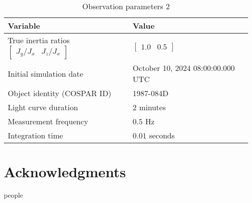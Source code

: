 \documentclass[a4paper,twocolumn]{spaceDebrisC} %
\begin{document}
\begin{table}[ht]
  \centering
  \caption{Observation parameters 2}
  \vspace*{6pt}
  \begin{tabular}{|l|l|}
  \hline
  \textbf{Variable} & \textbf{Value} \\ \hline
  True inertia ratios $\begin{bmatrix}J_y / J_x & J_z / J_x\end{bmatrix}$ & $\begin{bmatrix} 1.0 & 0.5 \end{bmatrix}$ \\ \hline
  Initial simulation date & October 10, 2024 08:00:00.000 UTC \\ \hline
  Object identity (COSPAR ID) & 1987-084D \\ \hline 
 Light curve duration & $2$ minutes \\ \hline
 Measurement frequency & $0.5$ Hz \\ \hline
 Integration time & $0.01$ seconds \\ \hline
  \end{tabular}
  \label{tb:case1_in}
\end{table}

\section*{Acknowledgments}

people \cite{robinson2023}







\end{document}

